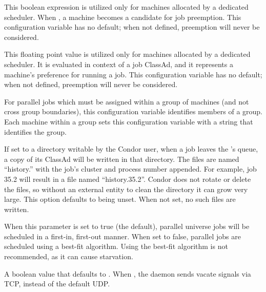 \begin{description}
\label{param:ScheddPreemptionRequirements}
\item[\Macro{SCHEDD\_PREEMPTION\_REQUIREMENTS}]
  This boolean expression is
  utilized only for machines allocated by a dedicated scheduler.
  When , a machine becomes a candidate for job preemption.
  This configuration variable has no default;
  when not defined, preemption will never be considered.

\label{param:ScheddPreemptionRank}
\item[\Macro{SCHEDD\_PREEMPTION\_RANK}]
  This floating point value is
  utilized only for machines allocated by a dedicated scheduler.
  It is evaluated in context of a job ClassAd,
  and it represents a machine's preference for running a job.
  This configuration variable has no default;
  when not defined, preemption will never be considered.

\label{param:ParallelSchedulingGroup}
\item[\Macro{ParallelSchedulingGroup}]
  For parallel jobs which must be assigned within a group
  of machines (and not cross group boundaries),
  this configuration variable identifies members of a group. 
  Each machine within a group sets this configuration variable with 
  a string that identifies the group.

\label{param:PerJobHistoryDir}
\item[\Macro{PER\_JOB\_HISTORY\_DIR}]
  If set to a directory writable by the Condor user, when a job
  leaves the 's queue, a copy of its ClassAd will
  be written in that directory.  The files are named ``history.''
  with the job's cluster and process number appended.  For
  example, job 35.2 will result in a file named ``history.35.2''.
  Condor does not rotate or delete the files, so without an
  external entity to clean the directory it can grow very large.
  This option defaults to being unset.  When not set, no such
  files are written.

\label{param:DedicatedSchedulerUseFifo}
\item[\Macro{DEDICATED\_SCHEDULER\_USE\_FIFO}]
  When this parameter is set to true (the default), parallel 
  universe jobs will be scheduled in a first-in, first-out manner.
  When set to false, parallel jobs are scheduled using a
  best-fit algorithm. Using the best-fit algorithm is not recommended,
  as it can cause starvation.

\label{param:ScheddSendVacateViaTcp}
\item[\Macro{SCHEDD\_SEND\_VACATE\_VIA\_TCP}]
  A boolean value that defaults to .
  When , the  daemon sends vacate signals via TCP,
  instead of the default UDP.


\end{description}
